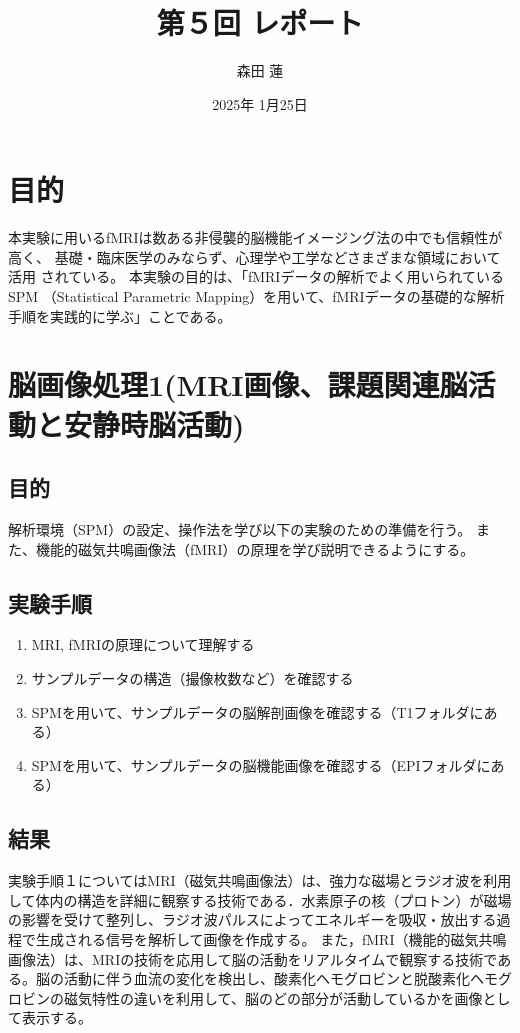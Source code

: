 \documentclass{jlreq}
\title{第５回 レポート}
\author{森田 蓮}
\date{2025年 1月25日}
\begin{document}
\maketitle

\section{目的}
本実験に用いるfMRIは数ある非侵襲的脳機能イメージング法の中でも信頼性が高く、
基礎・臨床医学のみならず、心理学や工学などさまざまな領域において活用
されている。
本実験の目的は、「fMRIデータの解析でよく用いられているSPM
（Statistical Parametric Mapping）を用いて、fMRIデータの基礎的な解析
手順を実践的に学ぶ」ことである。

\section{脳画像処理1(MRI画像、課題関連脳活動と安静時脳活動)}
\subsection{目的}
解析環境（SPM）の設定、操作法を学び以下の実験のための準備を行う。
また、機能的磁気共鳴画像法（fMRI）の原理を学び説明できるようにする。
\subsection{実験手順}
\begin{enumerate}
    \item MRI, fMRIの原理について理解する 
    \item サンプルデータの構造（撮像枚数など）を確認する
    \item SPMを用いて、サンプルデータの脳解剖画像を確認する（T1フォルダにある）
    \item SPMを用いて、サンプルデータの脳機能画像を確認する（EPIフォルダにある）
\end{enumerate}
\subsection{結果}
実験手順１についてはMRI（磁気共鳴画像法）は、強力な磁場とラジオ波を利用して体内の構造を詳細に観察する技術である．水素原子の核（プロトン）が磁場の影響を受けて整列し、ラジオ波パルスによってエネルギーを吸収・放出する過程で生成される信号を解析して画像を作成する。
また，fMRI（機能的磁気共鳴画像法）は、MRIの技術を応用して脳の活動をリアルタイムで観察する技術である。脳の活動に伴う血流の変化を検出し、酸素化ヘモグロビンと脱酸素化ヘモグロビンの磁気特性の違いを利用して、脳のどの部分が活動しているかを画像として表示する。
\end{document}
